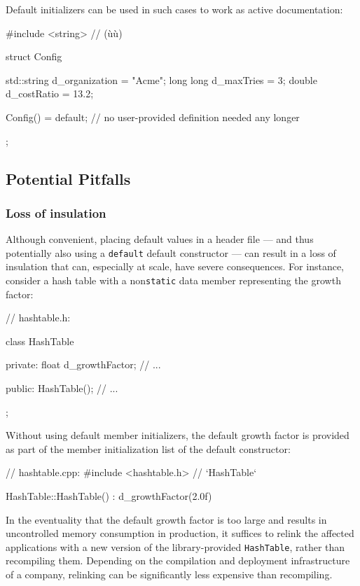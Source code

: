 Default initializers can be used in such cases to work as active
documentation:

\begin{emcppslisting}
#include <string>  // (ù{}ù)

struct Config
{
   std::string d_organization = "Acme";
   long long   d_maxTries     = 3;
   double      d_costRatio    = 13.2;

   Config() = default;  // no user-provided definition needed any longer
};
\end{emcppslisting}
    

\subsection[Potential Pitfalls]{Potential Pitfalls}\label{potential-pitfalls}

\subsubsection[Loss of insulation]{Loss of insulation}\label{loss-of-insulation}

Although convenient, placing default values in a header file --- and
thus potentially also using a \lstinline!default! default constructor ---
can result in a loss of insulation that can, especially at scale, have
severe consequences. For instance, consider a hash table with a
non\lstinline!static! data member representing the growth factor:

\begin{emcppslisting}[emcppsbatch=e5]
// hashtable.h:

class HashTable
{
private:
    float d_growthFactor;
    // ...

public:
    HashTable();
    // ...
};
\end{emcppslisting}
    

Without using default member initializers, the default growth factor is
provided as part of the member initialization list of the default
constructor:

\begin{emcppslisting}[emcppsbatch=e5]
// hashtable.cpp:
#include <hashtable.h>  // `HashTable`

HashTable::HashTable() : d_growthFactor(2.0f) { }
\end{emcppslisting}
    

In the eventuality that the default growth factor is too large and
results in uncontrolled memory consumption in production, it suffices to
relink the affected applications with a new version of the
library-provided \lstinline!HashTable!, rather than recompiling them.
Depending on the compilation and deployment infrastructure of a company,
relinking can be significantly less expensive than recompiling.


